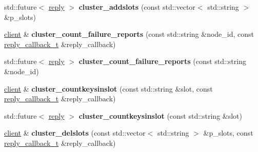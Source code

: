 \begin{DoxyCompactItemize}
\item 
\mbox{\label{classcpp__redis_1_1client_a0e14578c1addf1de66745a8a95e66aeb}} 
std\+::future$<$ \hyperlink{classcpp__redis_1_1reply}{reply} $>$ {\bfseries cluster\+\_\+addslots} (const std\+::vector$<$ std\+::string $>$ \&p\+\_\+slots)
\item 
\mbox{\label{classcpp__redis_1_1client_a757c2a5c8e5b42ccd3930d89d739f602}} 
\hyperlink{classcpp__redis_1_1client}{client} \& {\bfseries cluster\+\_\+count\+\_\+failure\+\_\+reports} (const std\+::string \&node\+\_\+id, const \hyperlink{classcpp__redis_1_1client_a061a1140d36d2eaeda82b09a0bb3f9f2}{reply\+\_\+callback\+\_\+t} \&reply\+\_\+callback)
\item 
\mbox{\label{classcpp__redis_1_1client_af1ff307eb9feb58b48b11bda78131a20}} 
std\+::future$<$ \hyperlink{classcpp__redis_1_1reply}{reply} $>$ {\bfseries cluster\+\_\+count\+\_\+failure\+\_\+reports} (const std\+::string \&node\+\_\+id)
\item 
\mbox{\label{classcpp__redis_1_1client_a78017860625d016074d0495c24c3f9e8}} 
\hyperlink{classcpp__redis_1_1client}{client} \& {\bfseries cluster\+\_\+countkeysinslot} (const std\+::string \&slot, const \hyperlink{classcpp__redis_1_1client_a061a1140d36d2eaeda82b09a0bb3f9f2}{reply\+\_\+callback\+\_\+t} \&reply\+\_\+callback)
\item 
\mbox{\label{classcpp__redis_1_1client_a8135eee3cfc95b061aee9b6f7271efce}} 
std\+::future$<$ \hyperlink{classcpp__redis_1_1reply}{reply} $>$ {\bfseries cluster\+\_\+countkeysinslot} (const std\+::string \&slot)
\item 
\mbox{\label{classcpp__redis_1_1client_a41f96bb9a627724570f1866d0983d7b2}} 
\hyperlink{classcpp__redis_1_1client}{client} \& {\bfseries cluster\+\_\+delslots} (const std\+::vector$<$ std\+::string $>$ \&p\+\_\+slots, const \hyperlink{classcpp__redis_1_1client_a061a1140d36d2eaeda82b09a0bb3f9f2}{reply\+\_\+callback\+\_\+t} \&reply\+\_\+callback)
\item 
\mbox{\label{classcpp__redis_1_1client_a6cd07520f60ee78c4603211273adcf46}} 

\end{DoxyCompactItemize}
